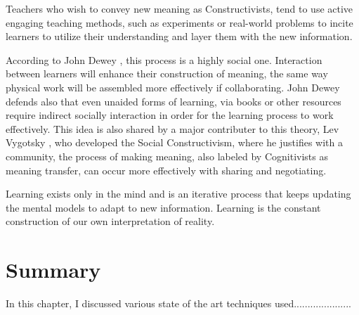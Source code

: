 Teachers who wish to convey new meaning as Constructivists, tend to use active 
engaging teaching methods, such as experiments or real-world problems to incite
learners to utilize their understanding and layer them with the new information.

According to John Dewey \cite{dewey_1938}, this process is a highly social one. 
Interaction between learners will enhance their construction of meaning, the same
way physical work will be assembled more effectively if collaborating.
John Dewey defends also that even unaided forms of learning, via books or other 
resources require indirect socially interaction in order for the learning process 
to work effectively. This idea is also shared by a major contributer to this theory,
Lev Vygotsky \cite{vygotsky_1978}, who developed the Social Constructivism, where 
he justifies with a community, the process of making meaning, also labeled by
Cognitivists as meaning transfer, can occur more effectively with sharing and 
negotiating.

Learning exists only in the mind and is an iterative process that keeps updating the
mental models to adapt to new information. Learning is the constant construction 
of our own interpretation of reality.



\section{Summary}

In this chapter, I discussed various state of the art techniques used.....................
